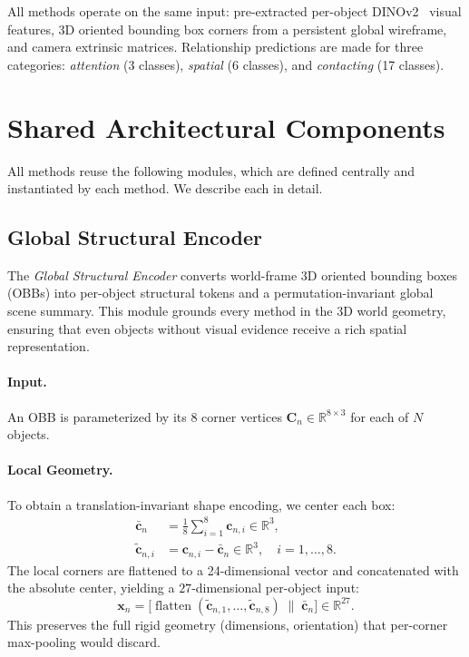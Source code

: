 \documentclass[runningheads]{llncs}
\newcommand{\mR}{\mathbb{R}}
\newcommand{\op}[1]{\operatorname{#1}}
\newcommand{\mat}[1]{\bm{#1}}
\begin{document}
All methods operate on the same input: pre-extracted per-object DINOv2~\cite{oquab2023dinov2} visual features, 3D oriented bounding box corners from a persistent global wireframe, and camera extrinsic matrices.  Relationship predictions are made for three categories: \textit{attention} (3 classes), \textit{spatial} (6 classes), and \textit{contacting} (17 classes).


\section{Shared Architectural Components}
\label{sec:shared}

All methods reuse the following modules, which are defined centrally and instantiated by each method.  We describe each in detail.

\subsection{Global Structural Encoder}
\label{sec:gse}

The \textit{Global Structural Encoder} converts world-frame 3D oriented bounding boxes (OBBs) into per-object structural tokens and a permutation-invariant global scene summary.  This module grounds every method in the 3D world geometry, ensuring that even objects without visual evidence receive a rich spatial representation.

\paragraph{Input.} An OBB is parameterized by its $8$ corner vertices $\mat{C}_n \in \mR^{8 \times 3}$ for each of $N$ objects.

\paragraph{Local Geometry.}  To obtain a translation-invariant shape encoding, we center each box:
\begin{align}
    \bar{\mat{c}}_n &= \frac{1}{8}\sum_{i=1}^{8}\mat{c}_{n,i} \in \mR^{3}, \label{eq:center} \\
    \tilde{\mat{c}}_{n,i} &= \mat{c}_{n,i} - \bar{\mat{c}}_n \in \mR^{3}, \quad i=1,\dots,8. \label{eq:local}
\end{align}
The local corners are flattened to a 24-dimensional vector and concatenated with the absolute center, yielding a $27$-dimensional per-object input:
\begin{equation}
    \mat{x}_n = \bigl[\op{flatten}(\tilde{\mat{c}}_{n,1},\dots,\tilde{\mat{c}}_{n,8}) \;\|\; \bar{\mat{c}}_n \bigr] \in \mR^{27}.
    \label{eq:gse_input}
\end{equation}
This preserves the full rigid geometry (dimensions, orientation) that per-corner max-pooling would discard.
\end{document}
